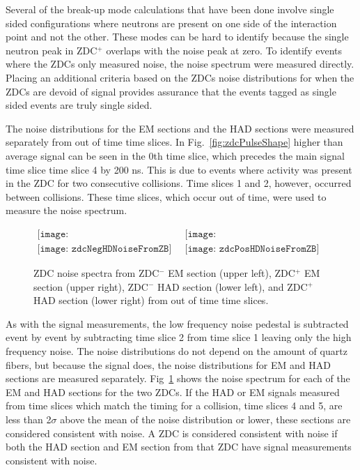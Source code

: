       Several of the break-up mode calculations that have been done involve
        single sided configurations where neutrons are present on one side
        of the interaction point and not the other.
      These modes can be hard to identify because the single neutron peak in 
        ZDC$^{+}$ overlaps with the noise peak at zero.
      To identify events where the ZDCs only measured noise, the noise
        spectrum were measured directly.
      Placing an additional criteria based on the ZDCs noise distributions for
        when the ZDCs are devoid of signal provides assurance that the events 
        tagged as single sided events are truly single sided.

      
      The noise distributions for the EM sections and the HAD sections were
        measured separately from out of time time slices.
      In Fig.~\ref{fig:zdcPulseShape} higher than average signal can be seen
        in the 0th time slice, which precedes the main signal time slice 
        time slice 4 by 200 ns. 
      This is due to events where activity was present in the ZDC for 
        two consecutive collisions.
      Time slices 1 and 2, however, occurred between collisions.
      These time slices, which occur out of time, were used to measure the 
        noise spectrum.
      \begin{figure}[!Hhbt]
        \centering
        $ \begin{array}{cc}
          \texttt{[image: zdcNegEMNoiseFromZBNoCor]} & 
          \texttt{[image: zdcPosEMNoiseFromZBNoCor]} \\
          \texttt{[image: zdcNegHDNoiseFromZB]} &
          \texttt{[image: zdcPosHDNoiseFromZB]}
        \end{array} $
        \caption{ZDC noise spectra from ZDC$^{-}$ EM section (upper left), 
          ZDC$^{+}$ EM section (upper right), ZDC$^{-}$ HAD section (lower left), 
          and ZDC$^{+}$ HAD section (lower right) from out of time time slices.}
        \label{fig:zdcNoiseSpectra}
      \end{figure}

      As with the signal measurements, the low frequency noise pedestal is 
        subtracted event by event by subtracting time slice 2 from time slice
        1 leaving only the high frequency noise.
      The noise distributions do not depend on the amount of quartz fibers, but
        because the signal does, the noise distributions for EM and HAD sections
        are measured separately.
      Fig~\ref{fig:zdcNoiseSpectra} shows the noise spectrum for each of the 
        EM and HAD sections for the two ZDCs.
      If the HAD or EM signals measured from time slices which match the 
        timing for a collision, time slices 4 and 5, are less than 2$\sigma$ 
        above the mean of the noise distribution or lower, these sections are 
        considered consistent with noise.
      A ZDC is considered consistent with noise if both the HAD section and EM 
        section from that ZDC have signal measurements consistent with noise.

